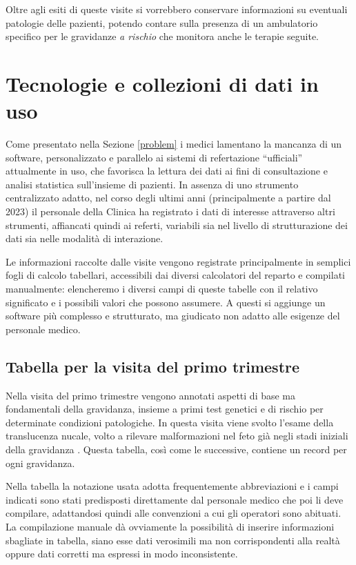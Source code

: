 Oltre agli esiti di queste visite si vorrebbero conservare informazioni su eventuali patologie delle pazienti, potendo contare sulla presenza di un ambulatorio specifico per le gravidanze \emph{a rischio} che monitora anche le terapie seguite.

\section{Tecnologie e collezioni di dati in uso}
\label{usednow}

Come presentato nella Sezione \ref{problem} i medici lamentano la mancanza di un software, personalizzato e parallelo ai sistemi di refertazione \enquote{ufficiali} attualmente in uso, che favorisca la lettura dei dati ai fini di consultazione e analisi statistica sull'insieme di pazienti.
In assenza di uno strumento centralizzato adatto, nel corso degli ultimi anni (principalmente a partire dal 2023) il personale della Clinica ha registrato i dati di interesse attraverso altri strumenti, affiancati quindi ai referti, variabili sia nel livello di strutturazione dei dati sia nelle modalità di interazione.

Le informazioni raccolte dalle visite vengono registrate principalmente in semplici fogli di calcolo tabellari, accessibili dai diversi calcolatori del reparto e compilati manualmente: elencheremo i diversi campi di queste tabelle con il relativo significato e i possibili valori che possono assumere.
A questi si aggiunge un software più complesso e strutturato, ma giudicato non adatto alle esigenze del personale medico.

\subsection{Tabella per la visita del primo trimestre}
\label{firsttrimester}

Nella visita del primo trimestre vengono annotati aspetti di base ma fondamentali della gravidanza, insieme a primi test genetici e di rischio per determinate condizioni patologiche.
In questa visita viene svolto l'esame della translucenza nucale, volto a rilevare malformazioni nel feto già negli stadi iniziali della gravidanza \cite{Sou05}.
Questa tabella, così come le successive, contiene un record per ogni gravidanza.

Nella tabella la notazione usata adotta frequentemente abbreviazioni e i campi indicati sono stati predisposti direttamente dal personale medico che poi li deve compilare, adattandosi quindi alle convenzioni a cui gli operatori sono abituati.
La compilazione manuale dà ovviamente la possibilità di inserire informazioni sbagliate in tabella, siano esse dati verosimili ma non corrispondenti alla realtà oppure dati corretti ma espressi in modo inconsistente.

